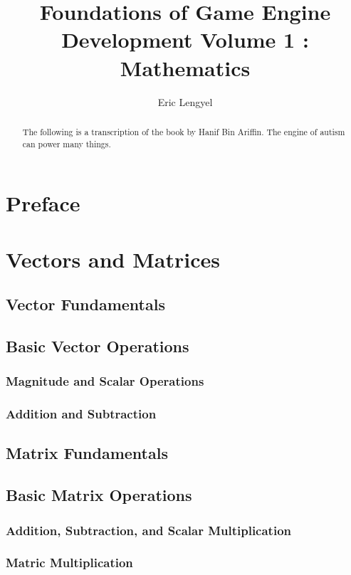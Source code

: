 \documentclass[a4paper,10pt]{article}
\title{Foundations of Game Engine Development Volume 1 : Mathematics}
\author{Eric Lengyel}
\begin{document}
\maketitle

\begin{abstract}

    The following is a transcription of the book by Hanif Bin Ariffin.
    The engine of autism can power many things.

\end{abstract}

\tableofcontents

\section{Preface}
\section{Vectors and Matrices}
\subsection{Vector Fundamentals}
\subsection{Basic Vector Operations}
\subsubsection{Magnitude and Scalar Operations}
\subsubsection{Addition and Subtraction}
\subsection{Matrix Fundamentals}
\subsection{Basic Matrix Operations}
\subsubsection{Addition, Subtraction, and Scalar Multiplication}
\subsubsection{Matric Multiplication}
\end{document}
